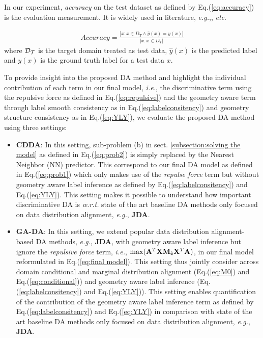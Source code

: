 \documentclass[journal,twocolumn]{IEEEtran}
\begin{document}
\begin{CJK*}{UTF8}{gkai}
In our experiment, {\emph{accuracy}}  on the test dataset as defined by Eq.(\ref{eq:accuracy}) is the evaluation measurement. It is widely used in literature, \textit{e.g.},\cite{pan2008transfer,long2015learning,DBLP:journals/corr/LuoWHC17,long2013transfer,DBLP:journals/tip/XuFWLZ16}, \textit{etc}.
							
	\begin{equation}\label{eq:accuracy}
		\begin{array}{c}
	Accuracy = \frac{{\left| {x:x \in {D_T} \wedge \hat y(x) = y(x)} \right|}}{{\left| {x:x \in {D_T}} \right|}}
	\end{array}
	\end{equation}
where ${\cal{D_T}}$ is the target domain treated as test data, ${\hat{y}(x)}$ is the predicted label and ${y(x)}$ is the ground truth label for a test data  $x$.

To provide insight into the proposed DA method and highlight the individual contribution of each term in our final model, \textit{i.e.}, the discriminative term using the repulsive force as defined in Eq.(\ref{eq:repulsive}) and the geometry aware term through label smooth consistency as in Eq.(\ref{eq:labelconsitency}) and geometry structure consistency as in Eq.(\ref{eq:YLY}), we evaluate the proposed DA method using three settings:
\begin{itemize}
\item \textbf{CDDA}: In this setting,  sub-problem (b) in sect. \ref{subsection:solving the model} as defined in Eq.(\ref{eq:prob2})  is simply replaced by the Nearest Neighbor (NN) predictor.  This correspond to our final DA model as defined in Eq.(\ref{eq:prob1}) which only makes use of the \textit{repulse force} term but without geometry aware label inference as defined by Eq.(\ref{eq:labelconsitency}) and Eq.(\ref{eq:YLY}). This setting makes it possible to understand how important discriminative DA is \textit{w.r.t.} state of the art baseline DA methods only focused on data distribution alignment, \textit{e.g.}, \textbf{JDA}. 


\item \textbf{GA-DA}: In this setting, we extend popular data distribution alignment-based DA methods,\textit{ e.g.}, \textbf{JDA}, with geometry aware label inference but ignore the \textit{repulsive force} term, \textit{i.e.},  $\max ({{\bf{A}}^T}{\bf{X}}{{\bf{M}}_{{\bf{\hat c}}}}{{\bf{X}}^T}{\bf{A}})$, in our final model reformulated in Eq.(\ref{eq:final model}). This setting thus jointly consider across domain conditional and marginal distribution alignment (Eq.(\ref{eq:M0}) and Eq.(\ref{eq:conditional})) and geometry aware label inference  (Eq.(\ref{eq:labelconsitency}) and Eq.(\ref{eq:YLY})). This setting enables  quantification of the contribution of the geometry aware label inference term as defined by Eq.(\ref{eq:labelconsitency}) and Eq.(\ref{eq:YLY}) in comparison with state of the art baseline DA methods only focused on data distribution alignment, \textit{e.g.}, \textbf{JDA}.


\end{itemize}
\end{CJK*}
\end{document}
